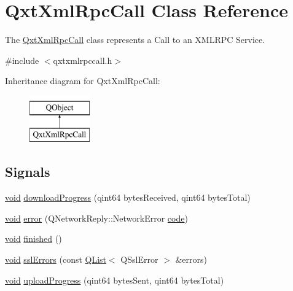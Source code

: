 \hypertarget{class_qxt_xml_rpc_call}{\section{Qxt\-Xml\-Rpc\-Call Class Reference}
\label{class_qxt_xml_rpc_call}
}


The \hyperlink{class_qxt_xml_rpc_call}{Qxt\-Xml\-Rpc\-Call} class represents a Call to an X\-M\-L\-R\-P\-C Service.  




{\ttfamily \#include $<$qxtxmlrpccall.\-h$>$}

Inheritance diagram for Qxt\-Xml\-Rpc\-Call\-:\begin{figure}[H]
\begin{center}
\leavevmode
\includegraphics[height=2.000000cm]{class_qxt_xml_rpc_call}
\end{center}
\end{figure}
\subsection*{Signals}
\begin{DoxyCompactItemize}
\item 
\hyperlink{group___u_a_v_objects_plugin_ga444cf2ff3f0ecbe028adce838d373f5c}{void} \hyperlink{class_qxt_xml_rpc_call_aff4378984e539db088e9562bffbc8a59}{download\-Progress} (qint64 bytes\-Received, qint64 bytes\-Total)
\item 
\hyperlink{group___u_a_v_objects_plugin_ga444cf2ff3f0ecbe028adce838d373f5c}{void} \hyperlink{class_qxt_xml_rpc_call_a4fc5ddbc9fe28ef85fe2a37d6181d964}{error} (Q\-Network\-Reply\-::\-Network\-Error \hyperlink{structcode}{code})
\item 
\hyperlink{group___u_a_v_objects_plugin_ga444cf2ff3f0ecbe028adce838d373f5c}{void} \hyperlink{class_qxt_xml_rpc_call_a0673ca43c4fab30464aa8781a78b952d}{finished} ()
\item 
\hyperlink{group___u_a_v_objects_plugin_ga444cf2ff3f0ecbe028adce838d373f5c}{void} \hyperlink{class_qxt_xml_rpc_call_a9e81baba642491aa9c798a85bf52bb7a}{ssl\-Errors} (const \hyperlink{class_q_list}{Q\-List}$<$ Q\-Ssl\-Error $>$ \&errors)
\item 
\hyperlink{group___u_a_v_objects_plugin_ga444cf2ff3f0ecbe028adce838d373f5c}{void} \hyperlink{class_qxt_xml_rpc_call_aebc8493fbed58bee3c22ca4654a44b38}{upload\-Progress} (qint64 bytes\-Sent, qint64 bytes\-Total)
\end{DoxyCompactItemize}
